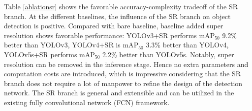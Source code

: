 Table \ref{ablationsr} shows the favorable accuracy-complexity tradeoff of the SR branch. At the different baselines, the influence of the SR branch on object detection is positive. Compared with bare baseline, baseline added super resolution shows favorable performance: YOLOv3+SR performs $\text{mA}{{\text{P}}_{\text{50}}}$ 9.2\% better than YOLOv3, YOLOv4+SR is $\text{mA}{{\text{P}}_{\text{50}}}$ 3.3\% better than YOLOv4, YOLOv5s+SR performs $\text{mA}{{\text{P}}_{\text{50}}}$ 2.2\% better than YOLOv5s. Notably, super resolution can be removed in the inference stage. Hence no extra parameters and computation costs are introduced, which is impressive considering that the SR branch does not require a lot of manpower to refine the design of the detection network. The SR branch is general and extensible and can be utilized in the existing fully convolutional network (FCN) framework.


